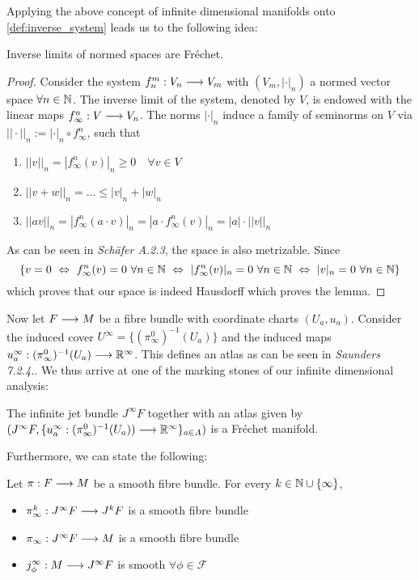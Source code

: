 Applying the above concept of infinite dimensional manifolds onto \ref{def:inverse_system} leads us to the following idea:

\begin{lem}
  Inverse limits of normed spaces are Fréchet.
\begin{proof}
  Consider the system $f^m_n: V_n \longrightarrow V_m$ with $(V_m, |\cdot |_n)$ a normed vector space $\forall n\in \mathbb{N}$. The inverse limit of the system, denoted by $V$, is endowed with the linear maps $f^n_\infty: V  \longrightarrow V_n$. The norms $|\cdot|_n$ induce a family of seminorms on $V$ via $||\cdot ||_n := |\cdot |_n \circ f^n_\infty$, such that
  \begin{enumerate}
    \item $||v||_n = |f^n_\infty(v)|_n \geq 0 \quad \forall v \in V$

    \item $||v+w||_n = ... \leq |v|_n + |w|_n$

    \item $||av||_n = |f^n_\infty(a\cdot v)|_n = |a\cdot f^n_\infty(v)|_n = |a| \cdot ||v||_n$
  \end{enumerate}
  As can be seen in \emph{Schäfer A.2.3}, the space is also metrizable. Since
  $$ \{v = 0 \ \Leftrightarrow \ f^n_\infty(v) = 0 \ \forall n \in \NN \ \Leftrightarrow \ |f^n_\infty(v)|_n = 0 \ \forall n \in \NN \ \Leftrightarrow \ |v|_n = 0 \ \forall n \in \NN \}  $$
  which proves that our space is indeed Hausdorff which proves the lemma.
\end{proof}
\end{lem}

Now let $F\longrightarrow M$ be a fibre bundle with coordinate charts $(U_a, u_a)$. Consider the induced cover $U^\infty = \{ (\pi^0_\infty)^{-1}(U_a) \}$ and the induced maps $u^\infty_a: (\pi^0_\infty)^{-1}(U_a) \longrightarrow \mathbb{R}^\infty$. This defines an atlas as can be seen in \emph{Saunders 7.2.4.}. We thus arrive at one of the marking stones of our infinite dimensional analysis:

\begin{prop}
  The infinite jet bundle $J^\infty F$ together with an atlas given by $(J^\infty F, \{u^\infty_a:(\pi^0_\infty)^{-1}(U_a))\longrightarrow \mathbb{R}^\infty\}_{a\in A})$ is a Fréchet manifold.
\end{prop}

Furthermore, we can state the following:

\begin{prop}
  Let $\pi:F\longrightarrow M$ be a smooth fibre bundle. For every $k \in \mathbb{N} \cup \{\infty\}$,
  \begin{itemize}
    \item $\pi^k_\infty: J^\infty F \longrightarrow J^k F$ is a smooth fibre bundle
    \item $\pi_\infty: J^\infty F \longrightarrow M$ is a smooth fibre bundle
    \item $j_\phi^\infty: M \lra J^\infty F$ is smooth $\forall \phi \in \mathcal{F}$
  \end{itemize}
\end{prop}

